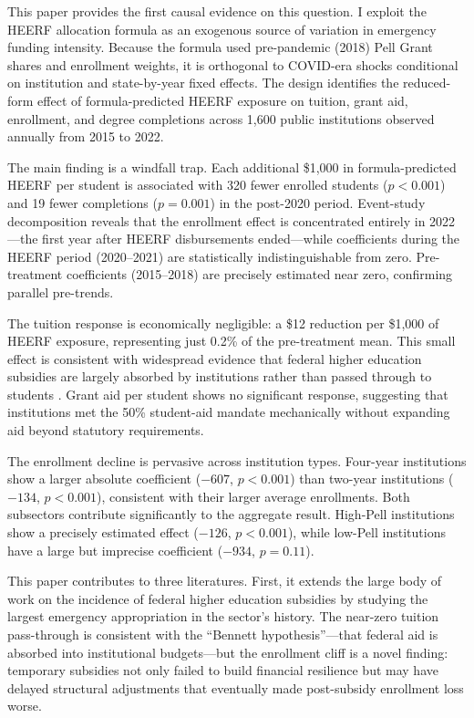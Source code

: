 \documentclass[12pt]{article}
\begin{document}
This paper provides the first causal evidence on this question. I exploit the HEERF allocation formula as an exogenous source of variation in emergency funding intensity. Because the formula used pre-pandemic (2018) Pell Grant shares and enrollment weights, it is orthogonal to COVID-era shocks conditional on institution and state-by-year fixed effects. The design identifies the reduced-form effect of formula-predicted HEERF exposure on tuition, grant aid, enrollment, and degree completions across 1,600 public institutions observed annually from 2015 to 2022.

The main finding is a windfall trap. Each additional \$1,000 in formula-predicted HEERF per student is associated with 320 fewer enrolled students ($p < 0.001$) and 19 fewer completions ($p = 0.001$) in the post-2020 period. Event-study decomposition reveals that the enrollment effect is concentrated entirely in 2022---the first year after HEERF disbursements ended---while coefficients during the HEERF period (2020--2021) are statistically indistinguishable from zero. Pre-treatment coefficients (2015--2018) are precisely estimated near zero, confirming parallel pre-trends.

The tuition response is economically negligible: a \$12 reduction per \$1,000 of HEERF exposure, representing just 0.2\% of the pre-treatment mean. This small effect is consistent with widespread evidence that federal higher education subsidies are largely absorbed by institutions rather than passed through to students \citep{cellini2010, lucca2019}. Grant aid per student shows no significant response, suggesting that institutions met the 50\% student-aid mandate mechanically without expanding aid beyond statutory requirements.

The enrollment decline is pervasive across institution types. Four-year institutions show a larger absolute coefficient ($-607$, $p < 0.001$) than two-year institutions ($-134$, $p < 0.001$), consistent with their larger average enrollments. Both subsectors contribute significantly to the aggregate result. High-Pell institutions show a precisely estimated effect ($-126$, $p < 0.001$), while low-Pell institutions have a large but imprecise coefficient ($-934$, $p = 0.11$).

This paper contributes to three literatures. First, it extends the large body of work on the incidence of federal higher education subsidies \citep{turner2017, cellini2010, lucca2019, dynarski2003} by studying the largest emergency appropriation in the sector's history. The near-zero tuition pass-through is consistent with the ``Bennett hypothesis''---that federal aid is absorbed into institutional budgets---but the enrollment cliff is a novel finding: temporary subsidies not only failed to build financial resilience but may have delayed structural adjustments that eventually made post-subsidy enrollment loss worse.
\end{document}
